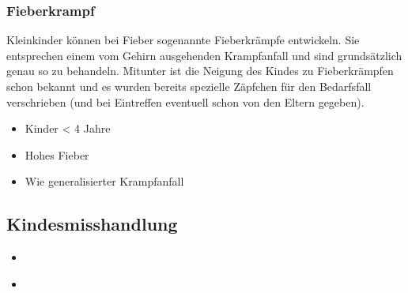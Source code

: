 \subsubsection{Fieberkrampf}
\label{topic:fieberkrampf}

{%
Kleinkinder  können bei Fieber sogenannte
Fieberkrämpfe entwickeln. Sie entsprechen einem vom Gehirn
ausgehenden Krampfanfall und sind grundsätzlich genau so zu
behandeln.
Mitunter ist die Neigung des Kindes zu Fieberkrämpfen schon
bekannt und es wurden bereits spezielle Zäpfchen für den
Bedarfsfall verschrieben (und bei Eintreffen eventuell schon
von den Eltern gegeben).
}{
\begin{itemize}
  \item Kinder {\textless} 4 Jahre
  \item Hohes Fieber
  \item Wie generalisierter Krampfanfall
\end{itemize}
}{}{}{}


%     
%     


\subsection{Kindesmisshandlung}
% 
% 
% 

{%
\begin{itemize}
  \item \CO{[KRI]} 
\end{itemize}
}{%
\begin{itemize}
  \item \CO{[KRI]} 
\end{itemize}
}{}{}{}




